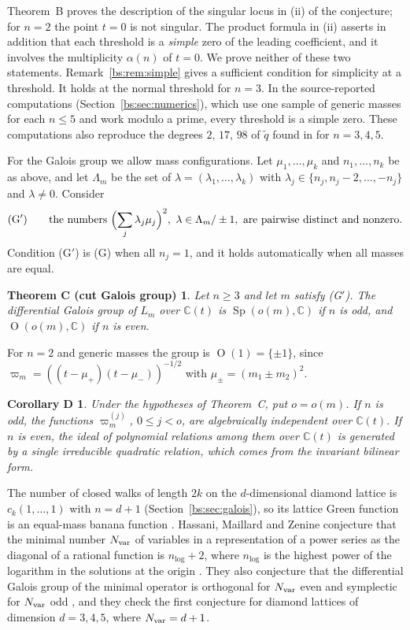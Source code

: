 \documentclass[11pt,a4paper]{article}
\newtheorem*{theoremC}{Theorem C (cut Galois group)}
\newtheorem*{corollaryD}{Corollary D}
\theoremstyle{definition}
\theoremstyle{remark}
\numberwithin{equation}{section}
\newcommand{\C}{\mathbb{C}}
\DeclareMathOperator{\Ort}{O}
\DeclareMathOperator{\Sp}{Sp}
\begin{document}
Theorem~B proves the description of the singular locus in (ii) of the conjecture; for $n=2$ the point $t=0$ is not singular. The product formula in (ii) asserts in addition that each threshold is a \emph{simple} zero of the leading coefficient, and it involves the multiplicity $\alpha(n)$ of $t=0$. We prove neither of these two statements. Remark~\ref{bs:rem:simple} gives a sufficient condition for simplicity at a threshold. It holds at the normal threshold for $n=3$. In the source-reported computations (Section~\ref{bs:sec:numerics}), which use one sample of generic masses for each $n\le5$ and work modulo a prime, every threshold is a simple zero. These computations also reproduce the degrees $2$, $17$, $98$ of $\tilde q$ found in \cite[\S\S4.2--4.4]{LV23} for $n=3,4,5$.

For the Galois group we allow mass configurations. Let $\mu_1,\dots,\mu_k$ and $n_1,\dots,n_k$ be as above, and let $\Lambda_m$ be the set of $\lambda=(\lambda_1,\dots,\lambda_k)$ with $\lambda_j\in\{n_j,n_j-2,\dots,-n_j\}$ and $\lambda\ne0$. Consider
\[
\text{(G$'$)}\qquad\text{the numbers }\Bigl(\sum_j\lambda_j\mu_j\Bigr)^2,\ \lambda\in\Lambda_m/\pm1,\ \text{are pairwise distinct and nonzero.}
\]
Condition (G$'$) is (G) when all $n_j=1$, and it holds automatically when all masses are equal.

\begin{theoremC}\label{bs:thm:biggroup}
Let $n\ge3$ and let $m$ satisfy {\rm(G$'$)}. The differential Galois group of $L_m$ over $\C(t)$ is $\Sp(o(m),\C)$ if $n$ is odd, and $\Ort(o(m),\C)$ if $n$ is even.
\end{theoremC}

For $n=2$ and generic masses the group is $\Ort(1)=\{\pm1\}$, since $\varpi_m=((t-\mu_+)(t-\mu_-))^{-1/2}$ with $\mu_\pm=(m_1\pm m_2)^2$.

\begin{corollaryD}
Under the hypotheses of Theorem~C, put $o=o(m)$. If $n$ is odd, the functions $\varpi_m^{(j)}$, $0\le j<o$, are algebraically independent over $\C(t)$. If $n$ is even, the ideal of polynomial relations among them over $\C(t)$ is generated by a single irreducible quadratic relation, which comes from the invariant bilinear form.
\end{corollaryD}

The number of closed walks of length $2k$ on the $d$-dimensional diamond lattice is $c_k(1,\dots,1)$ with $n=d+1$ (Section~\ref{bs:sec:galois}), so its lattice Green function is an equal-mass banana function \cite[(40)--(41)]{Gut10}. Hassani, Maillard and Zenine \cite{HMZ25} conjecture that the minimal number $N_{\rm var}$ of variables in a representation of a power series as the diagonal of a rational function is $n_{\log}+2$, where $n_{\log}$ is the highest power of the logarithm in the solutions at the origin \cite[\S1.2]{HMZ25}. They also conjecture that the differential Galois group of the minimal operator is orthogonal for $N_{\rm var}$ even and symplectic for $N_{\rm var}$ odd \cite[\S1.5]{HMZ25}, and they check the first conjecture for diamond lattices of dimension $d=3,4,5$, where $N_{\rm var}=d+1$.
\end{document}
